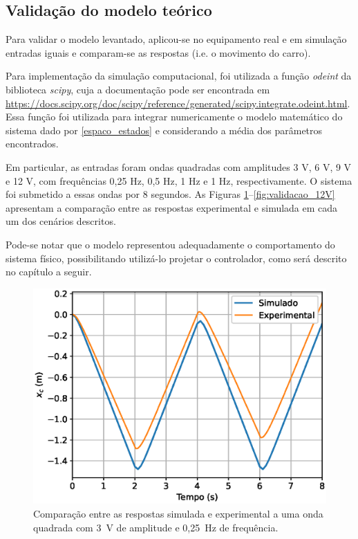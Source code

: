 \subsection{Validação do modelo teórico}
Para validar o modelo levantado, aplicou-se no equipamento real e em simulação entradas iguais e comparam-se as respostas (i.e. o movimento do carro). 

Para implementação da simulação computacional, foi utilizada a função \textit{odeint} da biblioteca \textit{scipy}, cuja a documentação pode ser encontrada em \url{https://docs.scipy.org/doc/scipy/reference/generated/scipy.integrate.odeint.html}. Essa função foi utilizada para integrar numericamente o modelo matemático do sistema dado por \eqref{espaco_estados} e considerando a média dos parâmetros encontrados.

Em particular, as entradas foram ondas quadradas com amplitudes 3 V, 6 V, 9 V e 12 V, com frequências 0,25 Hz, 0,5 Hz, 1 Hz e 1 Hz, respectivamente. O sistema foi submetido a essas ondas por 8 segundos. As Figuras \ref{fig:validacao_3V}--\ref{fig:validacao_12V} apresentam a comparação entre as respostas experimental e simulada em cada um dos cenários descritos.

Pode-se notar que o modelo representou adequadamente o comportamento do sistema físico, possibilitando utilizá-lo projetar o controlador, como será descrito no capítulo a seguir.

\begin{figure}[H]
    \centering
    \includegraphics[width=0.8\linewidth]{figuras/validacao_3V.eps}
    \caption[Comparação entre as respostas simulada e experimental a uma onda quadrada com 3~V de amplitude e 0,25~Hz de frequência]{Comparação entre as respostas simulada e experimental a uma onda quadrada com 3~V de amplitude e 0,25~Hz de frequência.}
    \label{fig:validacao_3V}
\end{figure}

